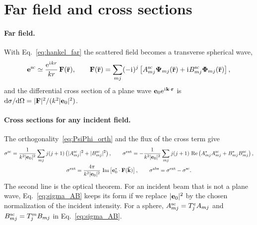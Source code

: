 \documentclass[
    pra,
    aps,
    reprint,
    onecolumn,
    amsmath,amssymb,
    a4paper,
    superscriptaddress,
    10pt,
    nofootinbib
]{revtex4-2}
\newcommand{\iu}{\mathrm{i}\mkern1mu}                 %
\newcommand{\eu}{\mathrm{e}\mkern1mu}                 %
\newcommand{\ort}[1]{\boldsymbol{\mathbf{\bar{#1}}}}  %
\newcommand{\jj}{j(j+1)}
\begin{document}
\section{Far field and cross sections}
\label{sec:crosssections}

\paragraph{Far field.}
With Eq.~\eqref{eq:hankel_far} the scattered field becomes a transverse spherical wave,
\begin{equation}
    \vb{e}^{\rm sc} \simeq \frac{\eu^{\iu kr}}{kr}\, \vb{F}(\ort{r}), \qquad
    \vb{F}(\ort{r}) = \sum_{mj}(-\iu)^j\left[A^{\rm sc}_{mj}\vb{\Psi}_{mj}(\ort{r}) + \iu B^{\rm sc}_{mj}\vb{\Phi}_{mj}(\ort{r})\right],
    \label{eq:farfield}
\end{equation}
and the differential cross section of a plane wave $\vb{e}_0\eu^{\iu\vb{k}\cdot\vb{r}}$ is $\dd\sigma/\dd\Omega = |\vb{F}|^2/(k^2|\vb{e}_0|^2)$.

\paragraph{Cross sections for any incident field.}
The orthogonality~\eqref{eq:PsiPhi_orth} and the flux of the cross term give~\cite{Toftul2023PRL,Thesis}
\begin{gather}
    \sigma^{\rm sc} = \frac{1}{k^2|\vb{e}_0|^2}\sum_{mj}\jj\left(|A^{\rm sc}_{mj}|^2 + |B^{\rm sc}_{mj}|^2\right), \qquad
    \sigma^{\rm ext} = -\frac{1}{k^2|\vb{e}_0|^2}\sum_{mj}\jj\, \Re\left(A^*_{mj}A^{\rm sc}_{mj} + B^*_{mj}B^{\rm sc}_{mj}\right),
    \label{eq:sigma_AB}
    \\
    \sigma^{\rm ext} = \frac{4\pi}{k^2|\vb{e}_0|^2}\, \Im\left[\vb{e}_0^*\cdot\vb{F}(\ort{k})\right], \qquad
    \sigma^{\rm abs} = \sigma^{\rm ext} - \sigma^{\rm sc} .
    \label{eq:optical_theorem}
\end{gather}
The second line is the optical theorem.
For an incident beam that is not a plane wave, Eq.~\eqref{eq:sigma_AB} keeps its form if we replace $|\vb{e}_0|^2$ by the chosen normalization of the incident intensity.
For a sphere, $A^{\rm sc}_{mj} = T^e_j A_{mj}$ and $B^{\rm sc}_{mj} = T^m_j B_{mj}$ in Eq.~\eqref{eq:sigma_AB}.
\end{document}
